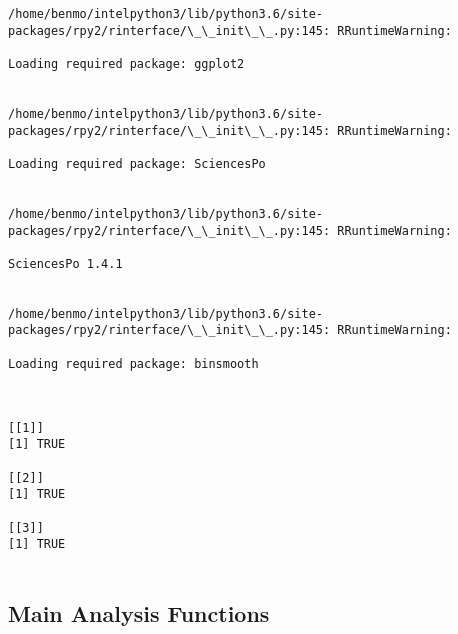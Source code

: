 \documentclass[11pt]{article}
\begin{document}
    \begin{Verbatim}[commandchars=\\\{\}]
/home/benmo/intelpython3/lib/python3.6/site-packages/rpy2/rinterface/\_\_init\_\_.py:145: RRuntimeWarning:

Loading required package: ggplot2


/home/benmo/intelpython3/lib/python3.6/site-packages/rpy2/rinterface/\_\_init\_\_.py:145: RRuntimeWarning:

Loading required package: SciencesPo


/home/benmo/intelpython3/lib/python3.6/site-packages/rpy2/rinterface/\_\_init\_\_.py:145: RRuntimeWarning:

SciencesPo 1.4.1


/home/benmo/intelpython3/lib/python3.6/site-packages/rpy2/rinterface/\_\_init\_\_.py:145: RRuntimeWarning:

Loading required package: binsmooth



    \end{Verbatim}

    
    \begin{verbatim}
[[1]]
[1] TRUE

[[2]]
[1] TRUE

[[3]]
[1] TRUE


    \end{verbatim}

    
    \hypertarget{main-analysis-functions}{%
\subsection{Main Analysis Functions}\label{main-analysis-functions}}
\end{document}
